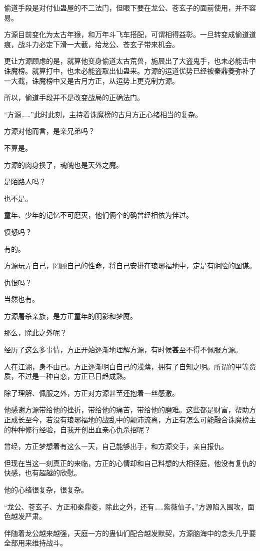\begin{this_body}
偷道手段是对付仙蛊屋的不二法门，但眼下要在龙公、苍玄子的面前使用，并不容易。

方源目前变化为太古年猴，和万年斗飞车搭配，可谓相得益彰。一旦转变成偷道道痕，战斗力必定下滑一大截，给龙公、苍玄子带来机会。

更让方源顾虑的是，就算他变身偷道太古荒兽，施展出了大盗鬼手，也未必能击中诛魔榜。就算打中，也未必能盗取出仙蛊来。方源的运道优势已经被秦鼎菱弥补了一大截，诛魔榜中又是古月方正，从运势上更克制方源。

所以，偷道手段并不是改变战局的正确法门。

“方源……”此时此刻，主持着诛魔榜的古月方正心绪相当的复杂。

方源对他而言，是亲兄弟吗？

不算是。

方源的肉身换了，魂魄也是天外之魔。

是陌路人吗？

也不是。

童年、少年的记忆不可磨灭，他们俩个的确曾经相依为伴过。

愤怒吗？

有的。

方源玩弄自己，罔顾自己的性命，将自己安排在琅琊福地中，定是有阴险的图谋。

仇恨吗？

当然也有。

方源屠杀亲族，是方正童年的阴影和梦魇。

那么，除此之外呢？

经历了这么多事情，方正开始逐渐地理解方源，有时候甚至不得不佩服方源。

人在江湖，身不由己。方正逐渐明白自己的浅薄，拥有了自知之明。所谓的甲等资质，不过是一种自恋，方正已日趋成熟。

除了理解、佩服之外，方正对方源甚至还抱着一丝感激。

他感谢方源带给他的挫折，带给他的痛苦，带给他的磨难。这些都是财富，帮助方正成长至今，若没有琅琊福地的战乱中的颠沛流离，方正有怎么可能融合诛魔榜主的种种修行经验，自我开创出血亲心仇杀招呢？

曾经，方正梦想着有这么一天，自己能够出手，和方源交手，亲自报仇。

但现在当这一刻真正的来临，方正的心情却和自己料想的大相径庭，他没有复仇的快感，也有超越的欣慰。

他的心绪很复杂，很复杂。

“龙公、苍玄子、方正和秦鼎菱，除此之外，还有……紫薇仙子。”方源陷入围攻，面色越发严肃。

伴随着龙公越来越强，天庭一方的蛊仙们配合越发默契，方源脑海中的念头几乎要全部用来维持战斗。


\end{this_body}
